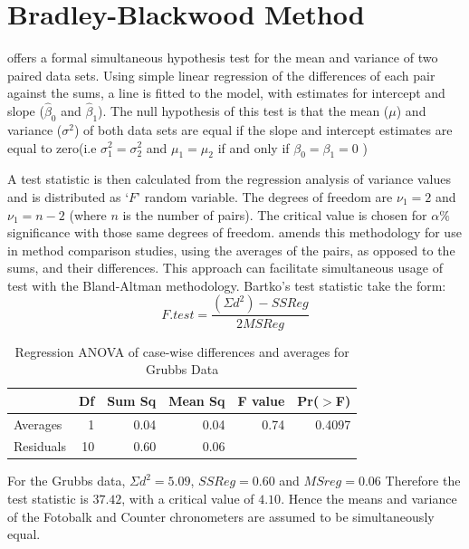 \documentclass[12pt, a4paper]{report}
\theoremstyle{plain}
\theoremstyle{definition}
\theoremstyle{remark}
\begin{document}
\section{Bradley-Blackwood Method}
\citet{BB89} offers a formal simultaneous hypothesis test for the
mean and variance of two paired data sets. Using simple linear
regression of the differences of each pair against the sums, a
line is fitted to the model, with estimates for intercept and
slope ($\hat{\beta}_{0}$ and $\hat{\beta}_{1}$). The null
hypothesis of this test is that the mean ($\mu$) and variance
($\sigma^{2}$) of both data sets are equal if the slope and
intercept estimates are equal to zero(i.e $\sigma^{2}_{1} =
\sigma^{2}_{2}$ and $\mu_{1}=\mu_{2}$ if and only if $\beta_{0}=
\beta_{1}=0$ )

A test statistic is then calculated from the regression analysis
of variance values \citep{BB89} and is distributed as `$F$' random
variable. The degrees of freedom are $\nu_{1}=2$ and $\nu_{1}=n-2$
(where $n$ is the number of pairs). The critical value is chosen
for $\alpha\%$ significance with those same degrees of freedom.
\citet{Bartko} amends this methodology for use in method
comparison studies, using the averages of the pairs, as opposed to
the sums, and their differences. This approach can facilitate
simultaneous usage of test with the Bland-Altman methodology.
Bartko's test statistic take the form:
\[ F.test = \frac{(\Sigma d^{2})-SSReg}{2MSReg}
\]
\begin{table}[ht]
	\begin{center}
		\begin{tabular}{lrrrrr}
			\hline
			& Df & Sum Sq & Mean Sq & F value & Pr($>$F) \\
			\hline
			Averages & 1 & 0.04 & 0.04 & 0.74 & 0.4097 \\
			Residuals & 10 & 0.60 & 0.06 &  &  \\
			\hline
		\end{tabular}
		\caption{Regression ANOVA of case-wise differences and averages
			for Grubbs Data}
	\end{center}
\end{table}

For the Grubbs data, $\Sigma d^{2}=5.09 $, $SSReg = 0.60$ and
$MSreg=0.06$ Therefore the test statistic is $37.42$, with a
critical value of $4.10$. Hence the means and variance of the
Fotobalk and Counter chronometers are assumed to be simultaneously
equal.
\end{document}
